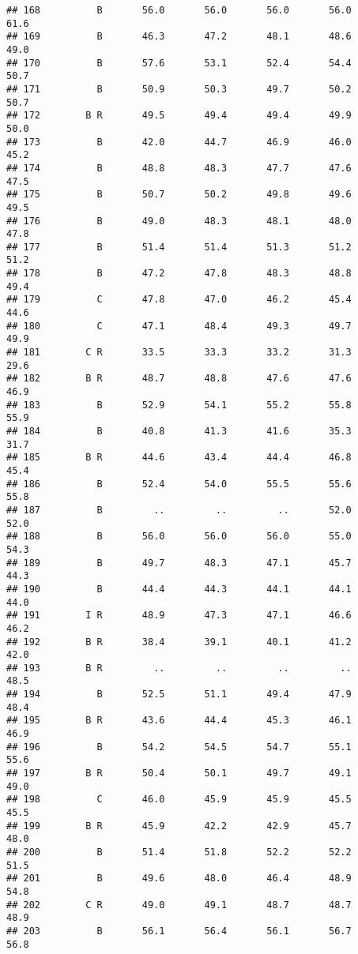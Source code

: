 \documentclass[]{article}
\begin{document}
\begin{verbatim}
## 168          B       56.0       56.0       56.0       56.0       61.6
## 169          B       46.3       47.2       48.1       48.6       49.0
## 170          B       57.6       53.1       52.4       54.4       50.7
## 171          B       50.9       50.3       49.7       50.2       50.7
## 172        B R       49.5       49.4       49.4       49.9       50.0
## 173          B       42.0       44.7       46.9       46.0       45.2
## 174          B       48.8       48.3       47.7       47.6       47.5
## 175          B       50.7       50.2       49.8       49.6       49.5
## 176          B       49.0       48.3       48.1       48.0       47.8
## 177          B       51.4       51.4       51.3       51.2       51.2
## 178          B       47.2       47.8       48.3       48.8       49.4
## 179          C       47.8       47.0       46.2       45.4       44.6
## 180          C       47.1       48.4       49.3       49.7       49.9
## 181        C R       33.5       33.3       33.2       31.3       29.6
## 182        B R       48.7       48.8       47.6       47.6       46.9
## 183          B       52.9       54.1       55.2       55.8       55.9
## 184          B       40.8       41.3       41.6       35.3       31.7
## 185        B R       44.6       43.4       44.4       46.8       45.4
## 186          B       52.4       54.0       55.5       55.6       55.8
## 187          B         ..         ..         ..       52.0       52.0
## 188          B       56.0       56.0       56.0       55.0       54.3
## 189          B       49.7       48.3       47.1       45.7       44.3
## 190          B       44.4       44.3       44.1       44.1       44.0
## 191        I R       48.9       47.3       47.1       46.6       46.2
## 192        B R       38.4       39.1       40.1       41.2       42.0
## 193        B R         ..         ..         ..         ..       48.5
## 194          B       52.5       51.1       49.4       47.9       48.4
## 195        B R       43.6       44.4       45.3       46.1       46.9
## 196          B       54.2       54.5       54.7       55.1       55.6
## 197        B R       50.4       50.1       49.7       49.1       49.0
## 198          C       46.0       45.9       45.9       45.5       45.5
## 199        B R       45.9       42.2       42.9       45.7       48.0
## 200          B       51.4       51.8       52.2       52.2       51.5
## 201          B       49.6       48.0       46.4       48.9       54.8
## 202        C R       49.0       49.1       48.7       48.7       48.9
## 203          B       56.1       56.4       56.1       56.7       56.8

\end{verbatim}
\end{document}
